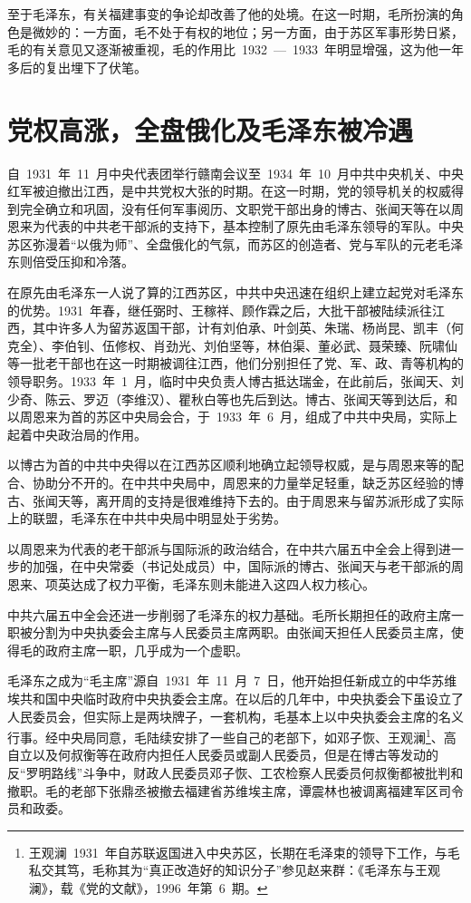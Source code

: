 至于毛泽东，有关福建事变的争论却改善了他的处境。在这一时期，毛所扮演的角色是微妙的：一方面，毛不处于有权的地位；另一方面，由于苏区军事形势日紧，毛的有关意见又逐渐被重视，毛的作用比~1932~—~1933~年明显增强，这为他一年多后的复出埋下了伏笔。

\section{党权高涨，全盘俄化及毛泽东被冷遇}

自~1931~年~11~月中央代表团举行赣南会议至~1934~年~10~月中共中央机关、中央红军被迫撤出江西，是中共党权大张的时期。在这一时期，党的领导机关的权威得到完全确立和巩固，没有任何军事阅历、文职党干部出身的博古、张闻天等在以周恩来为代表的中共老干部派的支持下，基本控制了原先由毛泽东领导的军队。中央苏区弥漫着“以俄为师”、全盘俄化的气氛，而苏区的创造者、党与军队的元老毛泽东则倍受压抑和冷落。

在原先由毛泽东一人说了算的江西苏区，中共中央迅速在组织上建立起党对毛泽东的优势。1931~年春，继任弼时、王稼祥、顾作霖之后，大批干部被陆续派往江西，其中许多人为留苏返国干部，计有刘伯承、叶剑英、朱瑞、杨尚昆、凯丰（何克全）、李伯钊、伍修权、肖劲光、刘伯坚等，林伯渠、董必武、聂荣臻、阮啸仙等一批老干部也在这一时期被调往江西，他们分别担任了党、军、政、青等机构的领导职务。1933~年~1~月，临时中央负责人博古抵达瑞金，在此前后，张闻天、刘少奇、陈云、罗迈（李维汉）、瞿秋白等也先后到达。博古、张闻天等到达后，和以周恩来为首的苏区中央局会合，于~1933~年~6~月，组成了中共中央局，实际上起着中央政治局的作用。

以博古为首的中共中央得以在江西苏区顺利地确立起领导权威，是与周恩来等的配合、协助分不开的。在中共中央局中，周恩来的力量举足轻重，缺乏苏区经验的博古、张闻天等，离开周的支持是很难维持下去的。由于周恩来与留苏派形成了实际上的联盟，毛泽东在中共中央局中明显处于劣势。

以周恩来为代表的老干部派与国际派的政治结合，在中共六届五中全会上得到进一步的加强，在中央常委（书记处成员）中，国际派的博古、张闻天与老干部派的周恩来、项英达成了权力平衡，毛泽东则未能进入这四人权力核心。

中共六届五中全会还进一步削弱了毛泽东的权力基础。毛所长期担任的政府主席一职被分割为中央执委会主席与人民委员主席两职。由张闻天担任人民委员主席，使得毛的政府主席一职，几乎成为一个虚职。

毛泽东之成为“毛主席”源自~1931~年~11~月~7~日，他开始担任新成立的中华苏维埃共和国中央临时政府中央执委会主席。在以后的几年中，中央执委会下虽设立了人民委员会，但实际上是两块牌子，一套机构，毛基本上以中央执委会主席的名义行事。经中央局同意，毛陆续安排了一些自己的老部下，如邓子恢、王观澜\footnote{王观澜~1931~年自苏联返国进入中央苏区，长期在毛泽束的领导下工作，与毛私交其笃，毛称其为“真正改造好的知识分子”参见赵来群：《毛泽东与王观澜》，载《党的文献》，1996~年第~6~期。}、高自立以及何叔衡等在政府内担任人民委员或副人民委员，但是在博古等发动的反“罗明路线”斗争中，财政人民委员邓子恢、工农检察人民委员何叔衡都被批判和撤职。毛的老部下张鼎丞被撤去福建省苏维埃主席，谭震林也被调离福建军区司令员和政委。

